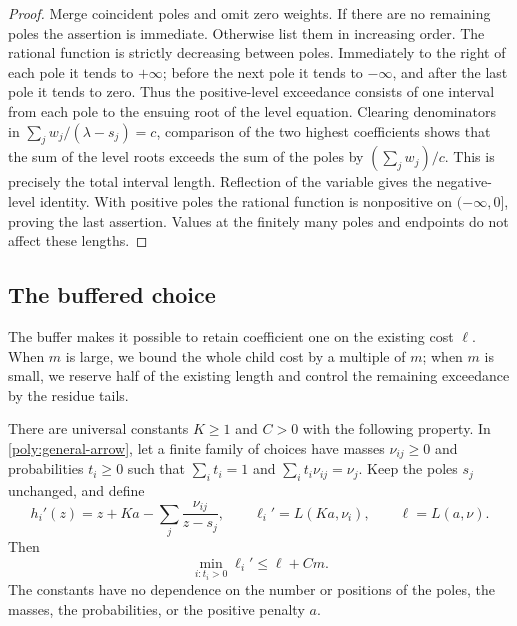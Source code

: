 \begin{proof}
Merge coincident poles and omit zero weights. If there are no remaining
poles the assertion is immediate. Otherwise list them in increasing
order. The rational function is strictly decreasing between poles.
Immediately to the right of each pole it tends to $+\infty$; before
the next pole it tends to $-\infty$, and after the last pole it tends
to zero. Thus the positive-level exceedance consists of one interval
from each pole to the ensuing root of the level equation. Clearing
denominators in
$\sum_jw_j/(\lambda-s_j)=c$, comparison of the two highest
coefficients shows that the sum of the level roots exceeds the sum
of the poles by $(\sum_jw_j)/c$. This is precisely the total interval
length. Reflection of the variable gives the negative-level identity.
With positive poles the rational function is nonpositive on
$(-\infty,0]$, proving the last assertion. Values at the finitely many
poles and endpoints do not affect these lengths.
\end{proof}

\subsection{The buffered choice}

The buffer makes it possible to retain coefficient one on the existing
cost $\ell$. When $m$ is large, we bound the whole child cost by a multiple
of $m$; when $m$ is small, we reserve half of the existing length and
control the remaining exceedance by the residue tails.

\begin{lemma}\label{lem:buffered-pin}
There are universal constants $K\geq1$ and $C>0$ with the following
property. In \eqref{poly:general-arrow}, let a finite family of choices
have masses $\nu_{ij}\geq0$ and probabilities $t_i\geq0$ such that
$\sum_i t_i=1$ and $\sum_i t_i\nu_{ij}=\nu_j$. Keep the poles $s_j$
unchanged, and define
\[
 h_i'(z)=z+Ka-\sum_j\frac{\nu_{ij}}{z-s_j},
 \qquad \ell_i'=L(Ka,\nu_i),\qquad \ell=L(a,\nu).
\]
Then
\begin{equation}\label{poly:buffered-pin-bound}
 \min_{i:t_i>0}\ell_i'\leq\ell+Cm.
\end{equation}
The constants have no dependence on the number or positions of the
poles, the masses, the probabilities, or the positive penalty $a$.
\end{lemma}

